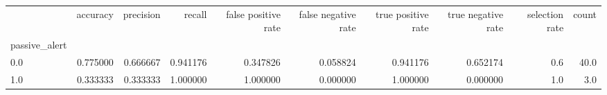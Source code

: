 \begin{tabular}{lrrrrrrrrr}
\toprule
{} &  accuracy &  precision &    recall &  false positive rate &  false negative rate &  true positive rate &  true negative rate &  selection rate &  count \\
passive\_alert &           &            &           &                      &                      &                     &                     &                 &        \\
\midrule
0.0           &  0.775000 &   0.666667 &  0.941176 &             0.347826 &             0.058824 &            0.941176 &            0.652174 &             0.6 &   40.0 \\
1.0           &  0.333333 &   0.333333 &  1.000000 &             1.000000 &             0.000000 &            1.000000 &            0.000000 &             1.0 &    3.0 \\
\bottomrule
\end{tabular}
